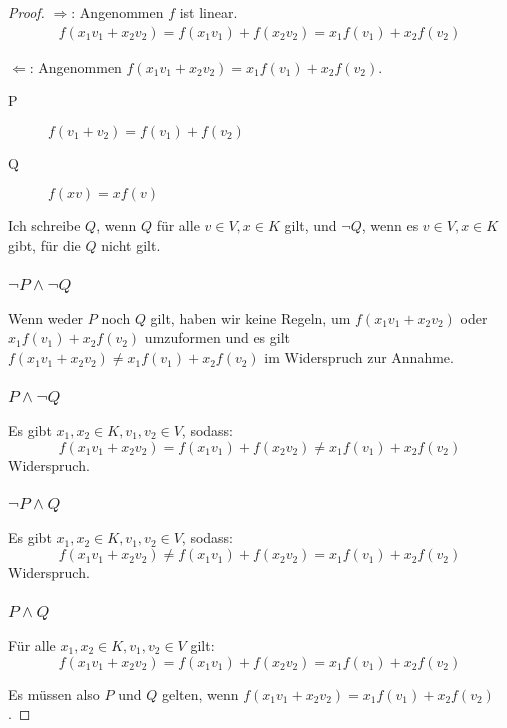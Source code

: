 \documentclass[a4paper,10pt]{article}
\begin{document}
\begin{proof}
 $\Rightarrow$: Angenommen $f$ ist linear.
 \begin{align*}
  f(x_1v_1 + x_2v_2) = f(x_1v_1) + f(x_2v_2) = x_1f(v_1) + x_2f(v_2)
 \end{align*}

 $\Leftarrow$: Angenommen $f(x_1v_1 + x_2v_2) = x_1f(v_1) + x_2f(v_2)$.

 \begin{description}
  \item[P] $f(v_1 + v_2) = f(v_1) + f(v_2)$
  \item[Q] $f(xv) = xf(v)$
 \end{description}

 Ich schreibe $Q$, wenn $Q$ für alle $v \in V, x \in K$ gilt, und $\neg{Q}$, wenn es $v \in V, x \in K$ gibt, für die $Q$ nicht gilt.

 \subsubsection*{$\neg P \land \neg Q$}
 
 Wenn weder $P$ noch $Q$ gilt, haben wir keine Regeln, um $f(x_1v_1 + x_2v_2)$ oder $x_1f(v_1) + x_2f(v_2)$ umzuformen und es gilt $f(x_1v_1 + x_2v_2) \ne x_1f(v_1) + x_2f(v_2)$ im Widerspruch zur Annahme.

 \subsubsection*{$P \land \neg Q$}
 
 Es gibt $x_1, x_2 \in K, v_1, v_2 \in V$, sodass:
 \begin{equation*}
  f(x_1v_1 + x_2v_2) = f(x_1v_1) + f(x_2v_2) \ne x_1f(v_1) + x_2f(v_2)
 \end{equation*}
 Widerspruch.

 \subsubsection*{$\neg P \land Q$}
 
 Es gibt $x_1, x_2 \in K, v_1, v_2 \in V$, sodass:
 \begin{equation*}
  f(x_1v_1 + x_2v_2) \ne f(x_1v_1) + f(x_2v_2) = x_1f(v_1) + x_2f(v_2)
 \end{equation*}
 Widerspruch.

 \subsubsection*{$P \land Q$}
 
 Für alle $x_1, x_2 \in K, v_1, v_2 \in V$ gilt:
 \begin{equation*}
  f(x_1v_1 + x_2v_2) = f(x_1v_1) + f(x_2v_2) = x_1f(v_1) + x_2f(v_2)
 \end{equation*}
 
 Es müssen also $P$ und $Q$ gelten, wenn $f(x_1v_1 + x_2v_2) = x_1f(v_1) + x_2f(v_2)$.
\end{proof}
\end{document}
